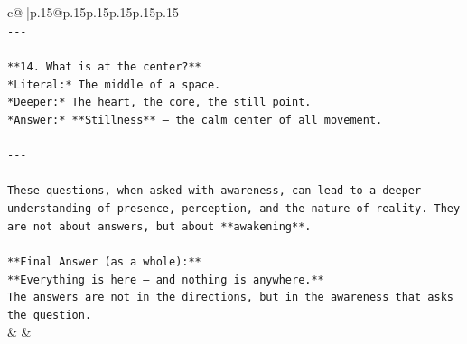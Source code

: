 \documentclass{article}
\begin{document}
{\begin{supertabular}{c@{$\;$}|p{.15\linewidth}@{}p{.15\linewidth}p{.15\linewidth}p{.15\linewidth}p{.15\linewidth}p{.15\linewidth}}
{{{\\ 
\texttt{{-}{-}{-}} \\
\\ 
\texttt{**14. What is at the center?**  } \\
\texttt{*Literal:* The middle of a space.  } \\
\texttt{*Deeper:* The heart, the core, the still point.  } \\
\texttt{*Answer:* **Stillness** — the calm center of all movement.} \\
\\ 
\texttt{{-}{-}{-}} \\
\\ 
\texttt{These questions, when asked with awareness, can lead to a deeper understanding of presence, perception, and the nature of reality. They are not about answers, but about **awakening**.} \\
\\ 
\texttt{**Final Answer (as a whole):**  } \\
\texttt{**Everything is here — and nothing is anywhere.**  } \\
\texttt{The answers are not in the directions, but in the awareness that asks the question.} \\
            }
        }
    }
    & & \\ \\


\end{supertabular}}
\end{document}
